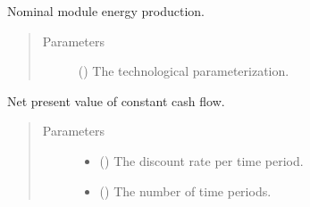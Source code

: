 \documentclass[letterpaper,10pt,english]{sphinxmanual}
\begin{document}

\begin{fulllineitems}
\label{\detokenize{doc-src/technology:technology.pv_residential_generic.module_power}}
Nominal module energy production.
\begin{quote}\begin{description}
\item[{Parameters}] \leavevmode
{} () \textendash{} The technological parameterization.

\end{description}\end{quote}

\end{fulllineitems}


\begin{fulllineitems}
\label{\detokenize{doc-src/technology:technology.pv_residential_generic.npv}}
Net present value of constant cash flow.
\begin{quote}\begin{description}
\item[{Parameters}] \leavevmode\begin{itemize}
\item {} 
 () \textendash{} The discount rate per time period.

\item {} 
 () \textendash{} The number of time periods.

\end{itemize}

\end{description}\end{quote}

\end{fulllineitems}
\end{document}
